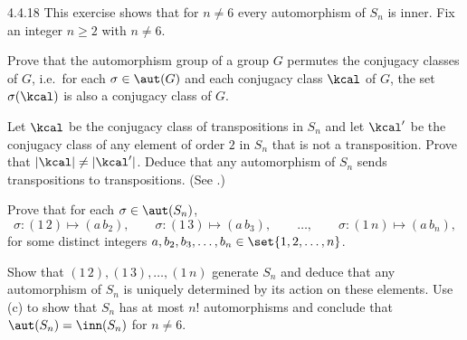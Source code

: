 \begin{spex}{4.4.18}
	This exercise shows that for $n\neq 6$ every automorphism of $S_n$ is inner.
	Fix an integer $n\ge 2$ with $n\neq 6$.
	\begin{subexercises}
		\item Prove that the automorphism group of a group $G$ permutes the conjugacy classes of $G$, i.e.\ for each $\sigma\in\aut(G)$ and each conjugacy class $\kcal$ of $G$, the set $\sigma(\kcal)$ is also a conjugacy class of $G$.
		\item Let $\kcal$ be the conjugacy class of transpositions in $S_n$ and let $\kcal'$ be the conjugacy class of any element of order $2$ in $S_n$ that is not a transposition.
		Prove that $|\kcal|\neq|\kcal'|$.
		Deduce that any automorphism of $S_n$ sends transpositions to transpositions. (See .)
		\item Prove that for each $\sigma\in\aut(S_n)$,
		\[
			\sigma:(1\,2)\mapsto(a\,b_2),\qquad \sigma:(1\,3)\mapsto(a\,b_3),\qquad \ldots,\qquad \sigma:(1\,n)\mapsto(a\,b_n),
		\]
		for some distinct integers $a,b_2,b_3,\ldots,b_n\in\set{1,2,\ldots,n}$.
		\item Show that $(1\,2),(1\,3),\ldots,(1\,n)$ generate $S_n$ and deduce that any automorphism of $S_n$ is uniquely determined by its action on these elements.
		Use (c) to show that $S_n$ has at most $n!$ automorphisms and conclude that $\aut(S_n)=\inn(S_n)$ for $n\neq 6$.
	\end{subexercises}
\end{spex}

